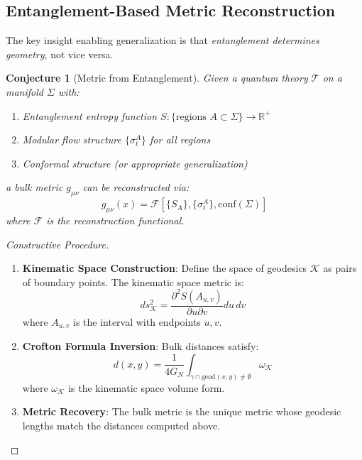 \documentclass[12pt,a4paper]{article}
\newtheorem{conjecture}[theorem]{Conjecture}
\begin{document}
\subsection{Entanglement-Based Metric Reconstruction}

The key insight enabling generalization is that \textit{entanglement determines geometry}, not vice versa.

\begin{conjecture}[Metric from Entanglement]
Given a quantum theory $\mathcal{T}$ on a manifold $\Sigma$ with:
\begin{enumerate}
    \item Entanglement entropy function $S: \{\text{regions } A \subset \Sigma\} \to \mathbb{R}^+$
    \item Modular flow structure $\{\sigma_t^A\}$ for all regions
    \item Conformal structure (or appropriate generalization)
\end{enumerate}
a bulk metric $g_{\mu\nu}$ can be reconstructed via:
\begin{equation}
g_{\mu\nu}(x) = \mathcal{F}[\{S_A\}, \{\sigma_t^A\}, \text{conf}(\Sigma)]
\end{equation}
where $\mathcal{F}$ is the reconstruction functional.
\end{conjecture}

\begin{proof}[Constructive Procedure]
\begin{enumerate}
    \item \textbf{Kinematic Space Construction}: Define the space of geodesics $\mathcal{K}$ as pairs of boundary points. The kinematic space metric is:
    \begin{equation}
    ds_{\mathcal{K}}^2 = \frac{\partial^2 S(A_{u,v})}{\partial u \partial v} du \, dv
    \end{equation}
    where $A_{u,v}$ is the interval with endpoints $u, v$.
    
    \item \textbf{Crofton Formula Inversion}: Bulk distances satisfy:
    \begin{equation}
    d(x, y) = \frac{1}{4G_N} \int_{\gamma \cap \text{geod}(x,y) \neq \emptyset} \omega_{\mathcal{K}}
    \end{equation}
    where $\omega_{\mathcal{K}}$ is the kinematic space volume form.
    
    \item \textbf{Metric Recovery}: The bulk metric is the unique metric whose geodesic lengths match the distances computed above.
\end{enumerate}
\end{proof}
\end{document}
